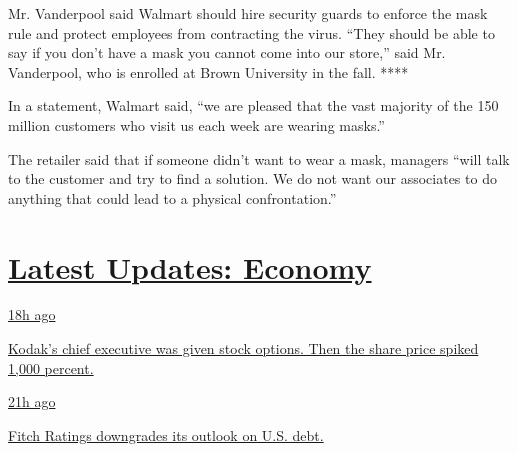 Mr. Vanderpool said Walmart should hire security guards to enforce the
mask rule and protect employees from contracting the virus. ``They
should be able to say if you don't have a mask you cannot come into our
store,'' said Mr. Vanderpool, who is enrolled at Brown University in the
fall. ****

In a statement, Walmart said, ``we are pleased that the vast majority of
the 150 million customers who visit us each week are wearing masks.''

The retailer said that if someone didn't want to wear a mask, managers
``will talk to the customer and try to find a solution. We do not want
our associates to do anything that could lead to a physical
confrontation.''

\hypertarget{latest-updates-economy}{%
\section{\texorpdfstring{\href{https://www.nytimes.com/live/2020/07/31/business/stock-market-today-coronavirus?action=click\&pgtype=Article\&state=default\&region=MAIN_CONTENT_1\&context=storylines_live_updates}{Latest
Updates:
Economy}}{Latest Updates: Economy}}\label{latest-updates-economy}}

\href{https://www.nytimes.com/live/2020/07/31/business/stock-market-today-coronavirus?action=click\&pgtype=Article\&state=default\&region=MAIN_CONTENT_1\&context=storylines_live_updates\#kodaks-chief-executive-was-given-stock-options-then-the-share-price-spiked-1000-percent}{18h
ago}

\href{https://www.nytimes.com/live/2020/07/31/business/stock-market-today-coronavirus?action=click\&pgtype=Article\&state=default\&region=MAIN_CONTENT_1\&context=storylines_live_updates\#kodaks-chief-executive-was-given-stock-options-then-the-share-price-spiked-1000-percent}{Kodak's
chief executive was given stock options. Then the share price spiked
1,000 percent.}

\href{https://www.nytimes.com/live/2020/07/31/business/stock-market-today-coronavirus?action=click\&pgtype=Article\&state=default\&region=MAIN_CONTENT_1\&context=storylines_live_updates\#fitch-ratings-downgrades-its-outlook-on-us-debt}{21h
ago}

\href{https://www.nytimes.com/live/2020/07/31/business/stock-market-today-coronavirus?action=click\&pgtype=Article\&state=default\&region=MAIN_CONTENT_1\&context=storylines_live_updates\#fitch-ratings-downgrades-its-outlook-on-us-debt}{Fitch
Ratings downgrades its outlook on U.S. debt.}

